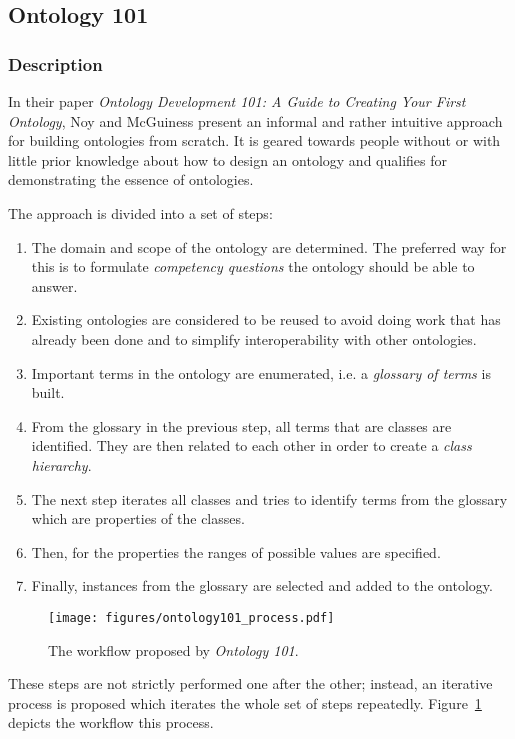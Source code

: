 \subsection{Ontology 101}
\label{subsec:approach1}

\subsubsection{Description}

In their paper \emph{Ontology Development 101: A Guide to Creating Your First Ontology}\cite{Ontology101}, Noy and McGuiness present an informal and rather intuitive approach for building ontologies from scratch. It is geared towards people without or with little prior knowledge about how to design an ontology and qualifies for demonstrating the essence of ontologies.

The approach is divided into a set of steps:
\begin{enumerate}
  \item The domain and scope of the ontology are determined. The preferred way for this is to formulate \emph{competency questions} the ontology should be able to answer.
  \item Existing ontologies are considered to be reused to avoid doing work that has already been done and to simplify interoperability with other ontologies.
  \item Important terms in the ontology are enumerated, i.e. a \emph{glossary of terms} is built.
  \item From the glossary in the previous step, all terms that are classes are identified. They are then related to each other in order to create a \emph{class hierarchy}.
  \item The next step iterates all classes and tries to identify terms from the glossary which are properties of the classes.
  \item Then, for the properties the ranges of possible values are specified.
  \item Finally, instances from the glossary are selected and added to the ontology.
\end{enumerate}

\begin{figure}
\centering
\texttt{[image: figures/ontology101\_process.pdf]}
\caption{The workflow proposed by \emph{Ontology 101}.}
\label{fig:ontology101_process}
\end{figure}

These steps are not strictly performed one after the other; instead, an iterative process is proposed which iterates the whole set of steps repeatedly. Figure~\ref{fig:ontology101_process} depicts the workflow this process.

